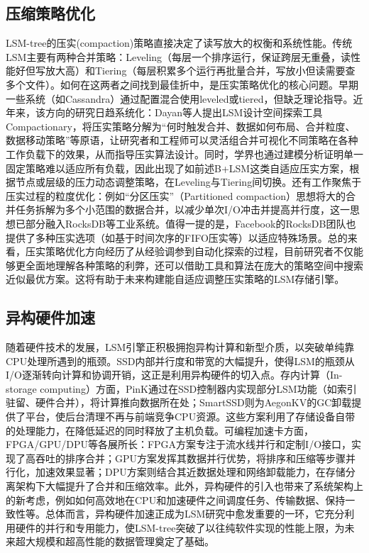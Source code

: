 \documentclass[lang=cn,11pt,a4paper]{elegantpaper}
\begin{document}
	\subsection{压缩策略优化}
	LSM-tree的压实(compaction)策略直接决定了读写放大的权衡和系统性能。传统LSM主要有两种合并策略：Leveling（每层一个排序运行，保证跨层无重叠，读性能好但写放大高）和Tiering（每层积累多个运行再批量合并，写放小但读需要查多个文件）。如何在这两者之间找到最佳折中，是压实策略优化的核心问题。早期一些系统（如Cassandra）通过配置混合使用leveled或tiered，但缺乏理论指导。近年来，该方向的研究日趋系统化：Dayan等人提出LSM设计空间探索工具Compactionary，将压实策略分解为“何时触发合并、数据如何布局、合并粒度、数据移动策略”等原语，让研究者和工程师可以灵活组合并可视化不同策略在各种工作负载下的效果，从而指导压实算法设计\cite{DBLP:conf/sigmod/SarkarCZA22}。同时，学界也通过建模分析证明单一固定策略难以适应所有负载，因此出现了如前述B+LSM这类自适应压实方案，根据节点或层级的压力动态调整策略，在Leveling与Tiering间切换\cite{DBLP:conf/hpdc/LiuJWLCY23}。还有工作聚焦于压实过程的粒度优化：例如“分区压实”（Partitioned compaction）思想将大的合并任务拆解为多个小范围的数据合并，以减少单次I/O冲击并提高并行度，这一思想已部分融入RocksDB等工业系统。值得一提的是，Facebook的RocksDB团队也提供了多种压实选项（如基于时间次序的FIFO压实等）以适应特殊场景\cite{DBLP:journals/pvldb/SarkarSZA21}。总的来看，压实策略优化方向经历了从经验调参到自动化探索的过程，目前研究者不仅能够更全面地理解各种策略的利弊，还可以借助工具和算法在庞大的策略空间中搜索近似最优方案。这将有助于未来构建能自适应调整压实策略的LSM存储引擎。
	
	\subsection{异构硬件加速}
	随着硬件技术的发展，LSM引擎正积极拥抱异构计算和新型介质，以突破单纯靠CPU处理所遇到的瓶颈。SSD内部并行度和带宽的大幅提升，使得LSM的瓶颈从I/O逐渐转向计算和协调开销，这正是利用异构硬件的切入点。存内计算（In-storage computing）方面，PinK通过在SSD控制器内实现部分LSM功能（如索引驻留、硬件合并），将计算推向数据所在处\cite{DBLP:conf/usenix/ImBCAL20}；SmartSSD则为AegonKV的GC卸载提供了平台，使后台清理不再与前端竞争CPU资源\cite{DBLP:conf/fast/DuanFLL0L25}。这些方案利用了存储设备自带的处理能力，在降低延迟的同时释放了主机负载。可编程加速卡方面，FPGA/GPU/DPU等各展所长：FPGA方案专注于流水线并行和定制I/O接口，实现了高吞吐的排序合并\cite{DBLP:conf/fast/ZhangWCXYHZH0CH20}；GPU方案发挥其数据并行优势，将排序和压缩等步骤并行化，加速效果显著\cite{zhou2024gpu}；DPU方案则结合其近数据处理和网络卸载能力，在存储分离架构下大幅提升了合并和压缩效率\cite{DBLP:journals/taco/DingZLLXWZ24}。此外，异构硬件的引入也带来了系统架构上的新考虑，例如如何高效地在CPU和加速硬件之间调度任务、传输数据、保持一致性等。总体而言，异构硬件加速正成为LSM研究中愈发重要的一环，它充分利用硬件的并行和专用能力，使LSM-tree突破了以往纯软件实现的性能上限，为未来超大规模和超高性能的数据管理奠定了基础。
	
\end{document}
